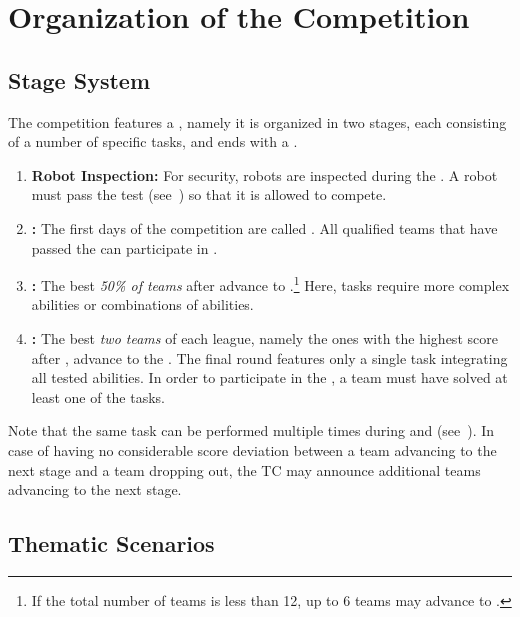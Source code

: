 \section{Organization of the Competition}
\label{sec:procedure_during_competition}

\subsection{Stage System}\label{rule:stages}

The competition features a , namely it is organized in two stages, each consisting of a number of specific tasks, and ends with a \FINAL.
\begin{enumerate}
	\item \textbf{Robot Inspection:} For security, robots are inspected during the \SetupDays.
	A robot must pass the \RobotInspection{} test (see~) so that it is allowed to compete.

	\item \textbf{\SONE:} The first days of the competition are called \SONE.
	All qualified teams that have passed the \RobotInspection{} can participate in \SONE.

	\item \textbf{\STWO:} The best \emph{50\% of teams} after \SONE{} advance to \STWO.\footnote{If the total number of teams is less than 12, up to 6 teams may advance to \STWO.}
	Here, tasks require more complex abilities or combinations of abilities.

	\item \textbf{\FINAL:} The best \emph{two teams} of each league, namely the ones with the highest score after \STWO, advance to the \FINAL.
	The final round features only a single task integrating all tested abilities.
	In order to participate in the \FINAL, a team must have solved at least one of the \STWO{} tasks.
\end{enumerate}
Note that the same task can be performed multiple times during \SONE{} and \STWO{} (see~).
In case of having no considerable score deviation between a team advancing to the next stage and a team dropping out, the TC may announce additional teams advancing to the next stage.

\subsection{Thematic Scenarios}
\label{rule:themes}

